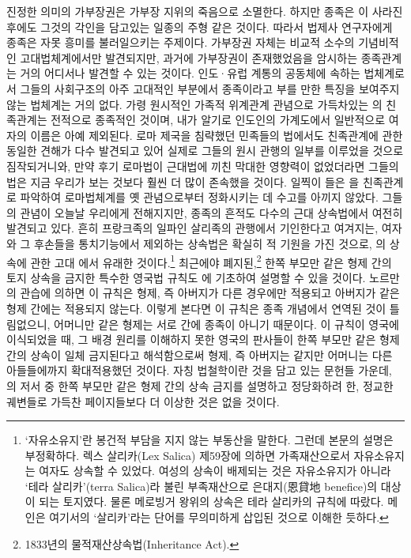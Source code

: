 진정한 의미의 가부장권은 가부장 지위의 죽음으로 소멸한다.
하지만 종족은 이 사라진 후에도 그것의 각인을 담고있는
일종의 주형 같은 것이다.
따라서 법제사 연구자에게 종족은 자못 흥미를 불러일으키는 주제이다.
가부장권 자체는 비교적 소수의 기념비적인 고대법체계에서만 발견되지만,
과거에 가부장권이 존재했었음을 암시하는 종족관계는
거의 어디서나 발견할 수 있는 것이다.
인도·유럽 계통의 공동체에 속하는 법체계로서
그들의 사회구조의 아주 고대적인 부분에서
종족이라고 부를 만한 특징을 보여주지 않는 법체계는 거의 없다.
가령
원시적인 가족적 위계관계 관념으로 가득차있는
의 친족관계는 전적으로 종족적인 것이며,
내가 알기로 인도인의 가계도에서 일반적으로 여자의 이름은 아예 제외된다.
로마 제국을 침략했던 민족들의 법에서도
친족관계에 관한 동일한 견해가 다수 발견되고 있어
실제로
그들의 원시 관행의 일부를 이루었을 것으로 짐작되거니와,
만약 후기 로마법이 근대법에 끼친 막대한 영향력이 없었더라면
그들의 법은 지금 우리가 보는 것보다 훨씬 더 많이 존속했을 것이다.
일찍이 들은 을  친족관계로 파악하여
로마법체계를 옛 관념으로부터 정화시키는 데 수고를 아끼지 않았다.
그들의 관념이 오늘날 우리에게 전해지지만,
종족의 흔적도 다수의 근대 상속법에서 여전히 발견되고 있다.
흔히 프랑크족의 일파인 살리족의 관행에서
기인한다고 여겨지는,
여자와 그 후손들을 통치기능에서 제외하는 상속법은
확실히 적 기원을 가진 것으로,
의 상속에 관한
고대 에서 유래한 것이다.\footnote{%
  `자유소유지'란 봉건적 부담을 지지 않는 부동산을 말한다.
  그런데 본문의 설명은 부정확하다.
  렉스 살리카(Lex Salica) 제59장에 의하면
  가족재산으로서 자유소유지는 여자도 상속할 수 있었다.
  여성의 상속이 배제되는 것은 자유소유지가 아니라
  `테라 살리카'(terra Salica)라 불린 부족재산으로
  은대지(恩貸地 benefice)의 대상이 되는 토지였다.
  물론 메로빙거 왕위의 상속은 테라 살리카의 규칙에 따랐다.
  메인은 여기서의 `살리카'라는 단어를 무의미하게 삽입된 것으로 이해한 듯하다.
   }
최근에야 폐지된,\footnote{%
  1833년의 물적재산상속법(Inheritance Act). }
한쪽 부모만 같은 형제 간의 토지 상속을 금지한
특수한 영국법 규칙도 에 기초하여 설명할 수 있을 것이다.
노르만의 관습에 의하면
이 규칙은  형제,
즉 아버지가 다른 경우에만 적용되고
아버지가 같은 형제 간에는 적용되지 않는다.
이렇게 본다면 이 규칙은 종족 개념에서 연역된 것이 틀림없으니,
어머니만 같은 형제는 서로 간에 종족이 아니기 때문이다.
이 규칙이 영국에 이식되었을 때,
그 배경 원리를 이해하지 못한 영국의 판사들이
한쪽 부모만 같은 형제 간의 상속이 일체 금지된다고 해석함으로써
 형제,
즉 아버지는 같지만 어머니는 다른 아들들에까지 확대적용했던 것이다.
자칭 법철학이란 것을 담고 있는 문헌들 가운데,
의 저서 중
한쪽 부모만 같은 형제 간의 상속 금지를 설명하고 정당화하려 한,
정교한 궤변들로 가득찬 페이지들보다 더 이상한 것은 없을 것이다.

